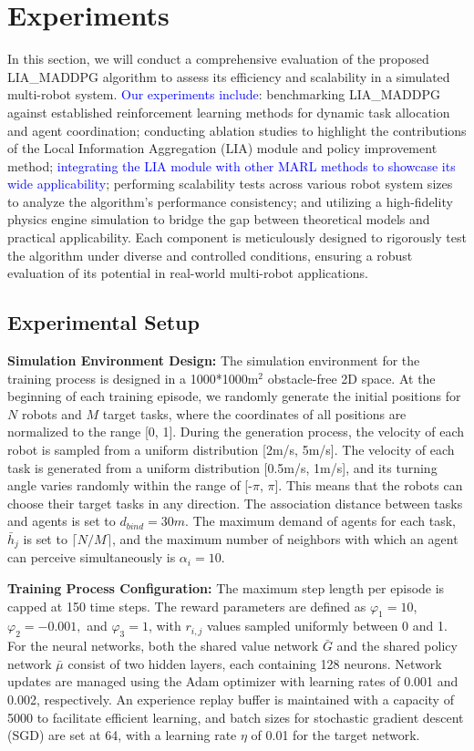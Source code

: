 \documentclass[lettersize,journal]{IEEEtran}
\newcommand{\blue}[1]{\textcolor{blue}{#1}}
\begin{document}
\section{Experiments}\label{section4}
In this section, we will conduct a comprehensive evaluation of the proposed LIA\_MADDPG algorithm to assess its efficiency and scalability in a simulated multi-robot system. \blue{Our experiments include}: benchmarking LIA\_MADDPG against established reinforcement learning methods for dynamic task allocation and agent coordination; conducting ablation studies to highlight the contributions of the Local Information Aggregation (LIA) module and policy improvement method; \blue{integrating the LIA module with other MARL methods to showcase its wide applicability}; performing scalability tests across various robot system sizes to analyze the algorithm’s performance consistency; and utilizing a high-fidelity physics engine simulation to bridge the gap between theoretical models and practical applicability. Each component is meticulously designed to rigorously test the algorithm under diverse and controlled conditions, ensuring a robust evaluation of its potential in real-world multi-robot applications. 

\subsection{Experimental Setup}
{\bf Simulation Environment Design:} The simulation environment for the training process is designed in a 1000*1000m$^2$ obstacle-free 2D space. At the beginning of each training episode, we randomly generate the initial positions for $N$ robots and $M$ target tasks, where the coordinates of all positions are normalized to the range [0, 1]. During the generation process, the velocity of each robot is sampled from a uniform distribution [2m/s, 5m/s]. The velocity of each task is generated from a uniform distribution [0.5m/s, 1m/s], and its turning angle varies randomly within the range of [-$\pi$, $\pi$]. This means that the robots can choose their target tasks in any direction. The association distance between tasks and agents is set to $d_{bind}=30m$. The maximum demand of agents for each task, $\bar{h}_j$ is set to $\lceil N/M \rceil$, and the maximum number of neighbors with which an agent can perceive simultaneously is $\alpha_i=10$.

{\bf Training Process Configuration:} The maximum step length per episode is capped at 150 time steps. The reward parameters are defined as $\varphi_1=10$, $\varphi_2=-0.001,$ and $\varphi_3=1$, with $r_{i,j}$ values sampled uniformly between 0 and 1. For the neural networks, both the shared value network $\bar{G}$ and the shared policy network $\bar{\mu}$ consist of two hidden layers, each containing 128 neurons. Network updates are managed using the Adam optimizer with learning rates of 0.001 and 0.002, respectively. An experience replay buffer is maintained with a capacity of 5000 to facilitate efficient learning, and batch sizes for stochastic gradient descent (SGD) are set at 64, with a learning rate $\eta$ of 0.01 for the target network.
\end{document}
